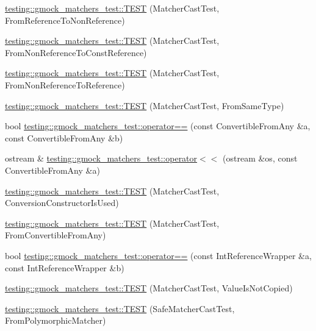 \begin{DoxyCompactItemize}
\hyperlink{namespacetesting_1_1gmock__matchers__test_a4bb3955a1e0b603c0156c98a2dc49eea}{testing\+::gmock\+\_\+matchers\+\_\+test\+::\+T\+E\+ST} (Matcher\+Cast\+Test, From\+Reference\+To\+Non\+Reference)
\item 
\hyperlink{namespacetesting_1_1gmock__matchers__test_a6fd48b8275f96d9d4ee840f0ec590fb1}{testing\+::gmock\+\_\+matchers\+\_\+test\+::\+T\+E\+ST} (Matcher\+Cast\+Test, From\+Non\+Reference\+To\+Const\+Reference)
\item 
\hyperlink{namespacetesting_1_1gmock__matchers__test_ab8d3174b8f1ab799906938ed9984643b}{testing\+::gmock\+\_\+matchers\+\_\+test\+::\+T\+E\+ST} (Matcher\+Cast\+Test, From\+Non\+Reference\+To\+Reference)
\item 
\hyperlink{namespacetesting_1_1gmock__matchers__test_a8f845dd5b1bcdc660926d67dce32b5d2}{testing\+::gmock\+\_\+matchers\+\_\+test\+::\+T\+E\+ST} (Matcher\+Cast\+Test, From\+Same\+Type)
\item 
bool \hyperlink{namespacetesting_1_1gmock__matchers__test_af0b7ba716a9150ff6db37abda4b44fc8}{testing\+::gmock\+\_\+matchers\+\_\+test\+::operator==} (const Convertible\+From\+Any \&a, const Convertible\+From\+Any \&b)
\item 
ostream \& \hyperlink{namespacetesting_1_1gmock__matchers__test_a2a2abd1e49c201ae26ed96211d4225eb}{testing\+::gmock\+\_\+matchers\+\_\+test\+::operator$<$$<$} (ostream \&os, const Convertible\+From\+Any \&a)
\item 
\hyperlink{namespacetesting_1_1gmock__matchers__test_a42e4d7d26704516436281897cb41bb1b}{testing\+::gmock\+\_\+matchers\+\_\+test\+::\+T\+E\+ST} (Matcher\+Cast\+Test, Conversion\+Constructor\+Is\+Used)
\item 
\hyperlink{namespacetesting_1_1gmock__matchers__test_ae51787fccc0f0a27e3725039c6cd48dc}{testing\+::gmock\+\_\+matchers\+\_\+test\+::\+T\+E\+ST} (Matcher\+Cast\+Test, From\+Convertible\+From\+Any)
\item 
bool \hyperlink{namespacetesting_1_1gmock__matchers__test_a33c068c32bf5118e5be92771b146db77}{testing\+::gmock\+\_\+matchers\+\_\+test\+::operator==} (const Int\+Reference\+Wrapper \&a, const Int\+Reference\+Wrapper \&b)
\item 
\hyperlink{namespacetesting_1_1gmock__matchers__test_ae99c08c8a815964b61f98a4785cf79b5}{testing\+::gmock\+\_\+matchers\+\_\+test\+::\+T\+E\+ST} (Matcher\+Cast\+Test, Value\+Is\+Not\+Copied)
\item 
\hyperlink{namespacetesting_1_1gmock__matchers__test_a29c04361c022a71711dbf9d3cf2a5050}{testing\+::gmock\+\_\+matchers\+\_\+test\+::\+T\+E\+ST} (Safe\+Matcher\+Cast\+Test, From\+Polymorphic\+Matcher)

\end{DoxyCompactItemize}
